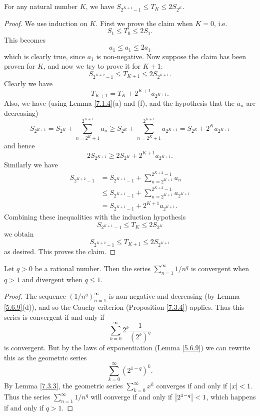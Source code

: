 \begin{lemma}\label{7.3.6}
    For any natural number \(K\), we have \(S_{2^{K + 1} - 1} \leq T_K \leq 2S_{2^K}\).
\end{lemma}

\begin{proof}
    We use induction on \(K\).
    First we prove the claim when \(K = 0\), i.e.
    \[
        S_1 \leq T_0 \leq 2S_1.
    \]
    This becomes
    \[
        a_1 \leq a_1 \leq 2a_1
    \]
    which is clearly true, since \(a_1\) is non-negative.
    Now suppose the claim has been proven for \(K\), and now we try to prove it for \(K + 1\):
    \[
        S_{2^{K + 2} - 1} \leq T_{K + 1} \leq 2S_{2^{K + 1}}.
    \]
    Clearly we have
    \[
        T_{K + 1} = T_K + 2^{K + 1} a_{2^{K + 1}}.
    \]
    Also, we have
    (using Lemma \ref{7.1.4}(a) and (f), and the hypothesis that the \(a_n\) are decreasing)
    \[
        S_{2^{K + 1}} = S_{2^K} + \sum_{n = 2^K + 1}^{2^{K + 1}} a_n \geq S_{2^K} + \sum_{n = 2^K + 1}^{2^{K + 1}} a_{2^{K + 1}} = S_{2^K} + 2^K a_{2^{K + 1}}
    \]
    and hence
    \[
        2S_{2^{K + 1}} \geq 2S_{2^K} + 2^{K + 1} a_{2^{K + 1}}.
    \]
    Similarly we have
    \begin{align*}
        S_{2^{K + 2} - 1} & = S_{2^{K + 1} - 1} + \sum_{n = 2^{K + 1}}^{2^{K + 2} - 1} a_n              \\
                          & \leq S_{2^{K + 1} - 1} + \sum_{n = 2^{K + 1}}^{2^{K + 2} - 1} a_{2^{K + 1}} \\
                          & = S_{2^{K + 1} - 1} + 2^{K + 1} a_{2^{K + 1}}.
    \end{align*}
    Combining these inequalities with the induction hypothesis
    \[
        S_{2^{K + 1} - 1} \leq T_K \leq 2S_{2^K}
    \]
    we obtain
    \[
        S_{2^{K + 2} - 1} \leq T_{K + 1} \leq 2S_{2^{K + 1}}
    \]
    as desired.
    This proves the claim.
\end{proof}

\begin{corollary}\label{7.3.7}
    Let \(q > 0\) be a rational number.
    Then the series \(\sum_{n = 1}^\infty 1 / n^q\) is convergent when \(q > 1\) and divergent when \(q \leq 1\).
\end{corollary}

\begin{proof}
    The sequence \((1 / n^q)_{n = 1}^\infty\) is non-negative and decreasing (by Lemma \ref{5.6.9}(d)), and so the Cauchy criterion (Proposition \ref{7.3.4}) applies.
    Thus this series is convergent if and only if
    \[
        \sum_{k = 0}^\infty 2^k \frac{1}{(2^k)^q}
    \]
    is convergent.
    But by the laws of exponentiation (Lemma \ref{5.6.9}) we can rewrite this as the geometric series
    \[
        \sum_{k = 0}^\infty (2^{1 - q})^k.
    \]
    By Lemma \ref{7.3.3}, the geometric series \(\sum_{k = 0}^\infty x^k\) converges if and only if \(\abs*{x} < 1\).
    Thus the series \(\sum_{n = 1}^\infty 1 / n^q\) will converge if and only if \(\abs*{2^{1 - q}} < 1\), which happens if and only if \(q > 1\).
\end{proof}

